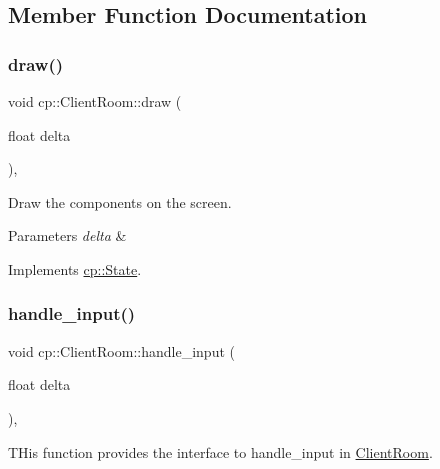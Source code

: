 

\subsection{Member Function Documentation}
\mbox{\label{classcp_1_1_client_room_a9c8ff4227d9fa5e35511c756ddaafc83}} 
\subsubsection{\texorpdfstring{draw()}{draw()}}
{\footnotesize\ttfamily void cp\+::\+Client\+Room\+::draw (\begin{DoxyParamCaption}\item[{float}]{delta }\end{DoxyParamCaption})\hspace{0.3cm}{\ttfamily [inline]}, {\ttfamily [virtual]}}



Draw the components on the screen. 


\begin{DoxyParams}{Parameters}
{\em delta} & \\
\hline
\end{DoxyParams}


Implements \hyperlink{classcp_1_1_state}{cp\+::\+State}.

\mbox{\label{classcp_1_1_client_room_a8e0de6eeab8147b7d918b11c2eeccecf}} 
\subsubsection{\texorpdfstring{handle\+\_\+input()}{handle\_input()}}
{\footnotesize\ttfamily void cp\+::\+Client\+Room\+::handle\+\_\+input (\begin{DoxyParamCaption}\item[{float}]{delta }\end{DoxyParamCaption})\hspace{0.3cm}{\ttfamily [inline]}, {\ttfamily [virtual]}}



T\+His function provides the interface to handle\+\_\+input in \hyperlink{classcp_1_1_client_room}{Client\+Room}. 


